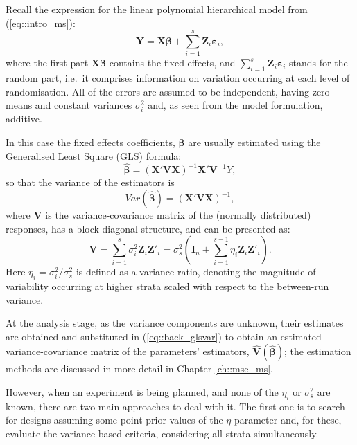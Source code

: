 \documentclass[11pt]{article}
\begin{document}
Recall the expression for the linear polynomial hierarchical model from (\ref{eq::intro_ms}):
\begin{equation}
\label{eq::back_ms}
\bm{Y}=\bm{X}\bm{\beta}+\sum_{i=1}^{s}\bm{Z}_{i}\bm{\varepsilon}_{i},
\end{equation} 
where the first part $\bm{X\beta}$ contains the fixed effects, and $\sum_{i=1}^{s}\bm{Z}_{i}\bm{\varepsilon}_{i}$ stands for the random part, i.e.~it comprises information on variation occurring at each level of randomisation. All of the errors are assumed to be independent, having zero means and constant variances $\sigma^2_{i}$ and, as seen from the model formulation, additive.

In this case the fixed effects coefficients, $\bm{\beta}$ are usually estimated using the Generalised Least Square (GLS) formula:
\begin{equation}
\label{eq::back_gls}
\bm{\hat{\beta}}=(\bm{X}'\bm{VX})^{-1}\bm{X}'\bm{V}^{-1}Y,
\end{equation}
so that the variance of the estimators is
\begin{equation}
\label{eq::back_glsvar}
Var(\bm{\hat{\beta}})=(\bm{X}'\bm{VX})^{-1},
\end{equation}
where $\bm{V}$ is the variance-covariance matrix of the (normally distributed) responses, has a block-diagonal structure, and can be presented as:
\begin{equation}
\label{eq::back_glsV}
\bm{V}=\sum_{i=1}^{s}\sigma^2_{i}\bm{Z}_{i}\bm{Z}'_{i}=\sigma^{2}_{s}\left(\bm{I}_{n}+\sum_{i=1}^{s-1}\eta_{i}\bm{Z}_{i}\bm{Z}'_{i}\right).
\end{equation}
Here $\eta_{i}=\sigma^{2}_{i}/\sigma^{2}_{s}$ is defined as a variance ratio, denoting the magnitude of variability occurring at higher strata scaled with respect to the between-run variance.

At the analysis stage, as the variance components are unknown, their estimates are obtained and substituted in (\ref{eq::back_glsvar}) to obtain an estimated variance-covariance matrix of the parameters' estimators, $\bm{\hat{V}(\hat{\beta})}$; the estimation methods are discussed in more detail in Chapter \ref{ch::mse_ms}.

However, when an experiment is being planned, and none of the $\eta_{i}$ or $\sigma^2_{s}$ are known, there are two main approaches to deal with it. The first one is to search for designs assuming some point prior values of the $\eta$ parameter and, for these, evaluate the variance-based criteria, considering all strata simultaneously.
\end{document}
